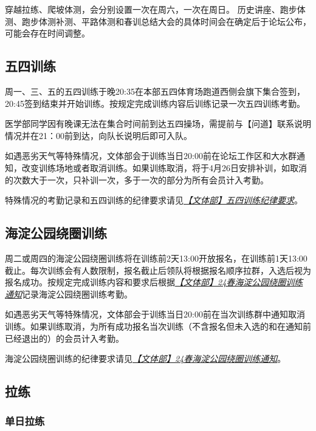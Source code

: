 \documentclass[UTF8]{ctexart}
\begin{document}
\begin{table}[h]
{\begin{tabular}
    \end{tabular}%
    }
\end{table}

穿越拉练、爬坡体测，会分别设置一次在周六，一次在周日。
历史讲座、跑步体测、跑步体测补测、平路体测和春训总结大会的具体时间会在确定后于论坛公布，可能会存在时间调整。

\subsection{五四训练}

周一、三、五的五四训练于晚20:35在本部五四体育场跑道西侧会旗下集合签到，20:45签到结束并开始训练。按规定完成训练内容后训练记录一次五四训练考勤。

医学部同学因有晚课无法在集合时间前到达五四操场，需提前与【问道】联系说明情况并在21：00前到达，向队长说明后即可入队。

如遇恶劣天气等特殊情况，文体部会于训练当日20:00前在论坛工作区和大水群通知，改变训练场地或者取消训练。如果训练取消，将于4月26日安排补训，如取消的次数大于一次，只补训一次，多于一次的部分为所有会员计入考勤。

特殊情况的考勤记录和五四训练的纪律要求请见\href{https://chexie.net/bbs/content/index.php?bid=1\&tid=9576\&p=1}{\textit{【文体部】五四训练纪律要求}}。


\subsection{海淀公园绕圈训练}

周二或周四的海淀公园绕圈训练将在训练前2天13:00开放报名，在训练前1天13:00截止。每次训练会有人数限制，报名截止后领队将根据报名顺序拉群，入选后视为报名成功。按规定完成训练内容和要求后根据\href{https://chexie.net/bbs/content/?bid=1&tid=9743&p=1}{\textit{【文体部】24春海淀公园绕圈训练通知}}记录海淀公园绕圈训练考勤。

如遇恶劣天气等特殊情况，文体部会于训练当日20:00前在当次训练群中通知取消训练。如果训练取消，为所有成功报名当次训练（不含报名但未入选的和在通知前已经退出的）的会员计入考勤。

海淀公园绕圈训练的纪律要求请见\href{https://chexie.net/bbs/content/?bid=1&tid=9743&p=1}{\textit{【文体部】24春海淀公园绕圈训练通知}}。

\subsection{拉练}

\subsubsection{单日拉练}
\end{document}
